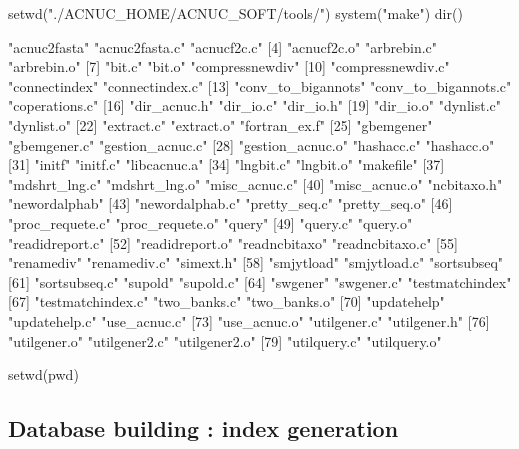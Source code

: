 \documentclass{article}
\begin{document}
\begin{itemize}
\begin{Schunk}
\begin{Sinput}
 setwd("./ACNUC_HOME/ACNUC_SOFT/tools/")
 system("make")
 dir()
\end{Sinput}
\begin{Soutput}
 [1] "acnuc2fasta"         "acnuc2fasta.c"       "acnucf2c.c"         
 [4] "acnucf2c.o"          "arbrebin.c"          "arbrebin.o"         
 [7] "bit.c"               "bit.o"               "compressnewdiv"     
[10] "compressnewdiv.c"    "connectindex"        "connectindex.c"     
[13] "conv_to_bigannots"   "conv_to_bigannots.c" "coperations.c"      
[16] "dir_acnuc.h"         "dir_io.c"            "dir_io.h"           
[19] "dir_io.o"            "dynlist.c"           "dynlist.o"          
[22] "extract.c"           "extract.o"           "fortran_ex.f"       
[25] "gbemgener"           "gbemgener.c"         "gestion_acnuc.c"    
[28] "gestion_acnuc.o"     "hashacc.c"           "hashacc.o"          
[31] "initf"               "initf.c"             "libcacnuc.a"        
[34] "lngbit.c"            "lngbit.o"            "makefile"           
[37] "mdshrt_lng.c"        "mdshrt_lng.o"        "misc_acnuc.c"       
[40] "misc_acnuc.o"        "ncbitaxo.h"          "newordalphab"       
[43] "newordalphab.c"      "pretty_seq.c"        "pretty_seq.o"       
[46] "proc_requete.c"      "proc_requete.o"      "query"              
[49] "query.c"             "query.o"             "readidreport.c"     
[52] "readidreport.o"      "readncbitaxo"        "readncbitaxo.c"     
[55] "renamediv"           "renamediv.c"         "simext.h"           
[58] "smjytload"           "smjytload.c"         "sortsubseq"         
[61] "sortsubseq.c"        "supold"              "supold.c"           
[64] "swgener"             "swgener.c"           "testmatchindex"     
[67] "testmatchindex.c"    "two_banks.c"         "two_banks.o"        
[70] "updatehelp"          "updatehelp.c"        "use_acnuc.c"        
[73] "use_acnuc.o"         "utilgener.c"         "utilgener.h"        
[76] "utilgener.o"         "utilgener2.c"        "utilgener2.o"       
[79] "utilquery.c"         "utilquery.o"        
\end{Soutput}
\begin{Sinput}
 setwd(pwd)
\end{Sinput}
\end{Schunk}

\end{itemize}
 
\subsection{Database building : index generation}
\end{document}
